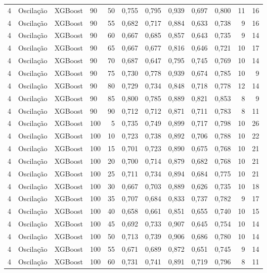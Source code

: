 \begin{longtable}{ccclrrrrrrrr}
4 & Oscilação & XGBoost & 90 & 50 & 0,755 & 0,795 & 0,939 & 0,697 & 0,800 & 11 & 16 \\
4 & Oscilação & XGBoost & 90 & 55 & 0,682 & 0,717 & 0,884 & 0,633 & 0,738 & 9 & 16 \\
4 & Oscilação & XGBoost & 90 & 60 & 0,667 & 0,685 & 0,857 & 0,643 & 0,735 & 9 & 14 \\
4 & Oscilação & XGBoost & 90 & 65 & 0,667 & 0,677 & 0,816 & 0,646 & 0,721 & 10 & 17 \\
4 & Oscilação & XGBoost & 90 & 70 & 0,687 & 0,647 & 0,795 & 0,745 & 0,769 & 10 & 14 \\
4 & Oscilação & XGBoost & 90 & 75 & 0,730 & 0,778 & 0,939 & 0,674 & 0,785 & 10 & 9 \\
4 & Oscilação & XGBoost & 90 & 80 & 0,729 & 0,734 & 0,848 & 0,718 & 0,778 & 12 & 14 \\
4 & Oscilação & XGBoost & 90 & 85 & 0,800 & 0,785 & 0,889 & 0,821 & 0,853 & 8 & 9 \\
4 & Oscilação & XGBoost & 90 & 90 & 0,712 & 0,712 & 0,871 & 0,711 & 0,783 & 8 & 11 \\
4 & Oscilação & XGBoost & 100 & 5 & 0,735 & 0,749 & 0,899 & 0,717 & 0,798 & 10 & 26 \\
4 & Oscilação & XGBoost & 100 & 10 & 0,723 & 0,738 & 0,892 & 0,706 & 0,788 & 10 & 22 \\
4 & Oscilação & XGBoost & 100 & 15 & 0,701 & 0,723 & 0,890 & 0,675 & 0,768 & 10 & 21 \\
4 & Oscilação & XGBoost & 100 & 20 & 0,700 & 0,714 & 0,879 & 0,682 & 0,768 & 10 & 21 \\
4 & Oscilação & XGBoost & 100 & 25 & 0,711 & 0,734 & 0,894 & 0,684 & 0,775 & 10 & 21 \\
4 & Oscilação & XGBoost & 100 & 30 & 0,667 & 0,703 & 0,889 & 0,626 & 0,735 & 10 & 18 \\
4 & Oscilação & XGBoost & 100 & 35 & 0,707 & 0,684 & 0,833 & 0,737 & 0,782 & 9 & 17 \\
4 & Oscilação & XGBoost & 100 & 40 & 0,658 & 0,661 & 0,851 & 0,655 & 0,740 & 10 & 15 \\
4 & Oscilação & XGBoost & 100 & 45 & 0,692 & 0,733 & 0,907 & 0,645 & 0,754 & 10 & 14 \\
4 & Oscilação & XGBoost & 100 & 50 & 0,713 & 0,739 & 0,906 & 0,686 & 0,780 & 10 & 14 \\
4 & Oscilação & XGBoost & 100 & 55 & 0,671 & 0,689 & 0,872 & 0,651 & 0,745 & 9 & 14 \\
4 & Oscilação & XGBoost & 100 & 60 & 0,731 & 0,741 & 0,891 & 0,719 & 0,796 & 8 & 11 \\

\end{longtable}
